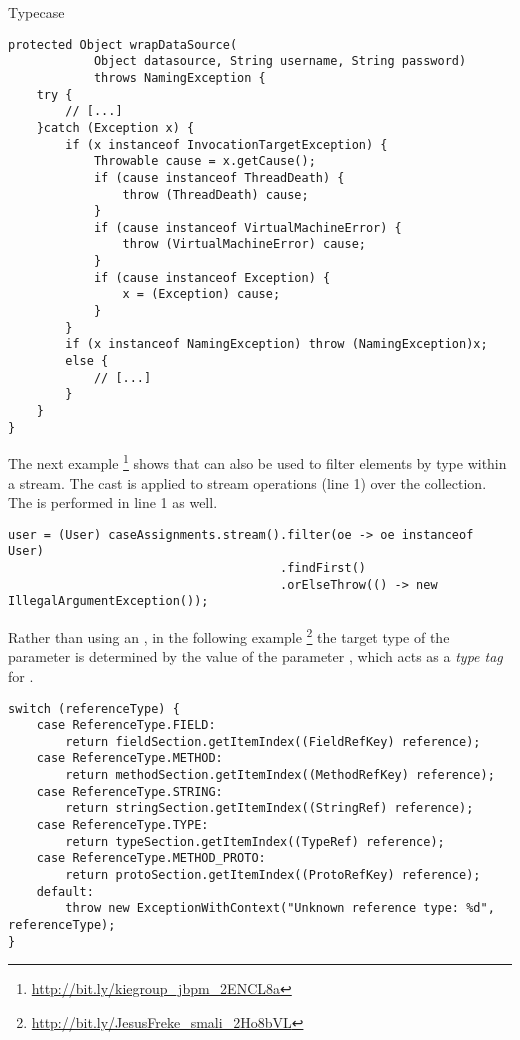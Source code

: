 \begin{pattern}{Typecase}
\begin{verbatim}
protected Object wrapDataSource(
			Object datasource, String username, String password)
			throws NamingException {
	try {
		// [...]
	}catch (Exception x) {
		if (x instanceof InvocationTargetException) {
			Throwable cause = x.getCause();
			if (cause instanceof ThreadDeath) {
				throw (ThreadDeath) cause;
			}
			if (cause instanceof VirtualMachineError) {
				throw (VirtualMachineError) cause;
			}
			if (cause instanceof Exception) {
				x = (Exception) cause;
			}
		}
		if (x instanceof NamingException) throw (NamingException)x;
		else {
			// [...]
		}
	}
}
\end{verbatim}

The next example%
\footnote{\url{http://bit.ly/kiegroup_jbpm_2ENCL8a}}
shows that
\thisp{} can also be used to filter elements by type within a stream.
The cast is applied to stream operations (line 1) over the  collection.
The  is performed in line 1 as well.

\begin{verbatim}
user = (User) caseAssignments.stream().filter(oe -> oe instanceof User)
                                      .findFirst()
                                      .orElseThrow(() -> new IllegalArgumentException());
\end{verbatim}

Rather than using an ,
in the following example%
\footnote{\url{http://bit.ly/JesusFreke_smali_2Ho8bVL}}
the target type of the parameter  is determined by the value
of the parameter ,
which acts as a \emph{type tag} for .

\begin{verbatim}
switch (referenceType) {
    case ReferenceType.FIELD:
        return fieldSection.getItemIndex((FieldRefKey) reference);
    case ReferenceType.METHOD:
        return methodSection.getItemIndex((MethodRefKey) reference);
    case ReferenceType.STRING:
        return stringSection.getItemIndex((StringRef) reference);
    case ReferenceType.TYPE:
        return typeSection.getItemIndex((TypeRef) reference);
    case ReferenceType.METHOD_PROTO:
        return protoSection.getItemIndex((ProtoRefKey) reference);
    default:
        throw new ExceptionWithContext("Unknown reference type: %d",  referenceType);
}
\end{verbatim}


\end{pattern}
